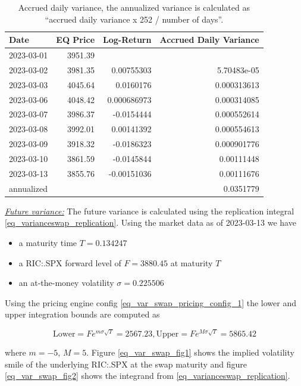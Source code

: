 \begin{table}[ht]
\begin{center}
\begin{tabular}{l|r|r|r}
Date & EQ Price & Log-Return & Accrued Daily Variance \\
\hline
2023-03-01 & 3951.39 & & \\
2023-03-02 & 3981.35 & 0.00755303 & 5.70483e-05 \\
2023-03-03 & 4045.64 & 0.0160176 & 0.000313613 \\
2023-03-06 & 4048.42 & 0.000686973 & 0.000314085 \\
2023-03-07 & 3986.37 & -0.0154444 & 0.000552614 \\
2023-03-08 & 3992.01 & 0.00141392 & 0.000554613 \\
2023-03-09 & 3918.32 & -0.0186323 & 0.000901776 \\
2023-03-10 & 3861.59 & -0.0145844 & 0.00111448 \\
2023-03-13 & 3855.76 & -0.00151036 & 0.00111676 \\
\hline
annualized & & & 0.0351779 
\end{tabular}
\end{center}
\caption{Accrued daily variance, the annualized variance is calculated as ``accrued daily variance x 252 / number of days''.}
\label{eq_var_swap_pricing_accrued_variance}
\end{table}

\bigskip

\underline{\emph{Future variance:}} The future variance is calculated using the replication integral
\ref{eq_varianceswap_replication}. Using the market data as of 2023-03-13 we have

\begin{itemize}
\item a maturity time $T = 0.134247$
\item a RIC:.SPX forward level of $F = 3880.45$ at maturity $T$
\item an at-the-money volatility $\sigma = 0.225506$
\end{itemize}

Using the pricing engine config \ref{eq_var_swap_pricing_config_1} the lower and upper integration bounds are computed as

$$
\text{Lower} = F e ^ {m \sigma \sqrt{T}} = 2567.23,  \text{Upper} = F e ^ {M \sigma \sqrt{T}} = 5865.42
$$

where $m=-5$, $M=5$. Figure \ref{eq_var_swap_fig1} shows the implied volatility smile of the underlying RIC:.SPX at the
swap maturity and figure \ref{eq_var_swap_fig2} shows the integrand from \ref{eq_varianceswap_replication}.

